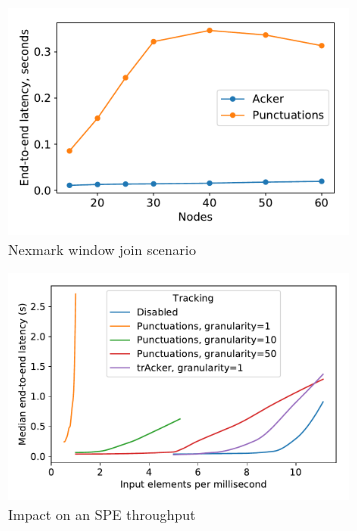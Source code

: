 \begin{figure}[t!]
    \begin{subfigure}[b]{0.3\textwidth}
            \includegraphics[width=0.99\textwidth]{Chapters/Tracker/pics/nexmark}
            \caption{Nexmark window join scenario}
            \label{fig:nexmark}
    \end{subfigure}
    \hspace{5mm}
    \begin{subfigure}[b]{0.3\textwidth}
            \includegraphics[width=0.99\textwidth]{Chapters/Tracker/pics/throughput_overhead_50}
            \caption{Impact on an SPE throughput}
            \label{throughput_overhead}
    \end{subfigure}
    \hspace{5mm}
    \begin{subfigure}[b]{0.3\textwidth}

\end{subfigure}
\end{figure}
